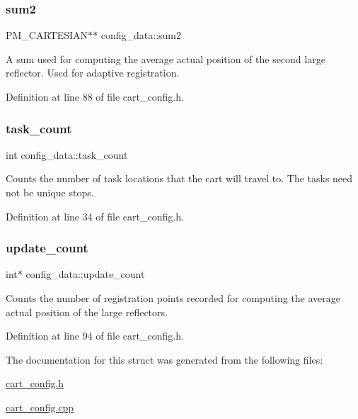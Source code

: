 \subsubsection{\texorpdfstring{sum2}{sum2}}
{\footnotesize\ttfamily P\+M\+\_\+\+C\+A\+R\+T\+E\+S\+I\+AN$\ast$$\ast$ config\+\_\+data\+::sum2}

A sum used for computing the average actual position of the second large reflector. Used for adaptive registration. 

Definition at line 88 of file cart\+\_\+config.\+h.

\mbox{\label{structconfig__data_a59732367f47b44028e541b861b07e319}} 
\subsubsection{\texorpdfstring{task\+\_\+count}{task\_count}}
{\footnotesize\ttfamily int config\+\_\+data\+::task\+\_\+count}

Counts the number of task locations that the cart will travel to. The tasks need not be unique stops. 

Definition at line 34 of file cart\+\_\+config.\+h.

\mbox{\label{structconfig__data_a6ace513dc3e25bf68ceb558cb0c47396}} 
\subsubsection{\texorpdfstring{update\+\_\+count}{update\_count}}
{\footnotesize\ttfamily int$\ast$ config\+\_\+data\+::update\+\_\+count}

Counts the number of registration points recorded for computing the average actual position of the large reflectors. 

Definition at line 94 of file cart\+\_\+config.\+h.



The documentation for this struct was generated from the following files\+:\begin{DoxyCompactItemize}
\item 
\mbox{\hyperlink{cart__config_8h}{cart\+\_\+config.\+h}}\item 
\mbox{\hyperlink{cart__config_8cpp}{cart\+\_\+config.\+cpp}}\end{DoxyCompactItemize}
